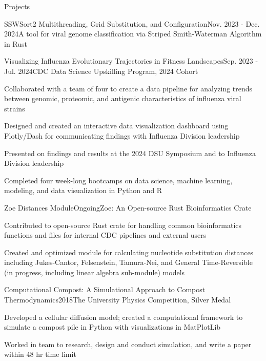 \documentclass{resume} %
\begin{document}
\begin{rSection}{Projects}
\begin{rSubsection}{SSWSort2 Multithreading, Grid Substitution, and Configuration}{Nov. 2023 - Dec. 2024}{A tool for viral genome classification via Striped Smith-Waterman Algorithm in Rust}{}
  \end{rSubsection}

  \begin{rSubsection}{Visualizing Influenza Evolutionary Trajectories in Fitness Landscapes}{Sep. 2023 - Jul. 2024}{CDC Data Science Upskilling Program, 2024 Cohort}{}
  \item Collaborated with a team of four to create a data pipeline for analyzing trends between genomic, proteomic, and antigenic characteristics of influenza viral strains
  \item Designed and created an interactive data visualization dashboard using Plotly/Dash for communicating findings with Influenza Division leadership
  \item Presented on findings and results at the 2024 DSU Symposium and to Influenza Division leadership
  \item Completed four week-long bootcamps on data science, machine learning, modeling, and data visualization in Python and R
  \end{rSubsection}

  \begin{rSubsection}{Zoe Distances Module}{Ongoing}{Zoe: An Open-source Rust Bioinformatics Crate}{}
  \item Contributed to open-source Rust crate for handling common bioinformatics functions and files for internal CDC pipelines and external users
  \item Created and optimized module for calculating nucleotide substitution distances including Jukes-Cantor, Felsenstein, Tamura-Nei, and General Time-Reversible (in progress, including linear algebra sub-module) models
  \end{rSubsection}

  \begin{rSubsection}{Computational Compost: A Simulational Approach to Compost Thermodynamics}{2018}{The University Physics Competition, Silver Medal}{}
  \item Developed a cellular diffusion model; created a computational framework to simulate a compost pile in Python with visualizations in MatPlotLib
  \item Worked in team to research, design and conduct simulation, and write a paper within 48 hr time limit
  \end{rSubsection}


\end{rSection}
\end{document}
